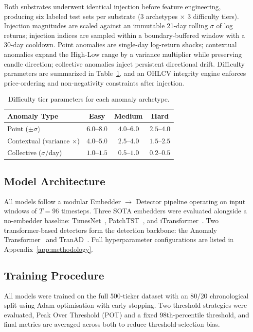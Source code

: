 \documentclass{llncs}
\begin{document}
Both substrates underwent identical injection before feature engineering, producing six labeled test sets per substrate (3 archetypes $\times$ 3 difficulty tiers). Injection magnitudes are scaled against an immutable 21-day rolling $\sigma$ of log returns; injection indices are sampled within a boundary-buffered window with a 30-day cooldown. Point anomalies are single-day log-return shocks; contextual anomalies expand the High-Low range by a variance multiplier while preserving candle direction; collective anomalies inject persistent directional drift. Difficulty parameters are summarized in Table~\ref{tab:difficulty}, and an OHLCV integrity engine enforces price-ordering and non-negativity constraints after injection.

\begin{table}[t]
\centering
\caption{Difficulty tier parameters for each anomaly archetype.}
\label{tab:difficulty}
\begin{tabular}{lccc}
\toprule
Anomaly Type & Easy & Medium & Hard \\
\midrule
Point ($\pm\sigma$) & $6.0$--$8.0$ & $4.0$--$6.0$ & $2.5$--$4.0$ \\
Contextual (variance $\times$) & $4.0$--$5.0$ & $2.5$--$4.0$ & $1.5$--$2.5$ \\
Collective ($\sigma$/day) & $1.0$--$1.5$ & $0.5$--$1.0$ & $0.2$--$0.5$ \\
\bottomrule
\end{tabular}
\end{table}

\subsection{Model Architecture}

All models follow a modular Embedder $\rightarrow$ Detector pipeline operating on input windows of $T = 96$ timesteps. Three SOTA embedders were evaluated alongside a no-embedder baseline: TimesNet~\cite{ref13}, PatchTST~\cite{ref9}, and iTransformer~\cite{ref5}. Two transformer-based detectors form the detection backbone: the Anomaly Transformer~\cite{ref15} and TranAD~\cite{ref12}. Full hyperparameter configurations are listed in Appendix~\ref{app:methodology}.

\subsection{Training Procedure}

All models were trained on the full 500-ticker dataset with an 80/20 chronological split using Adam optimisation with early stopping. Two threshold strategies were evaluated, Peak Over Threshold (POT) and a fixed 98th-percentile threshold, and final metrics are averaged across both to reduce threshold-selection bias.
\end{document}
